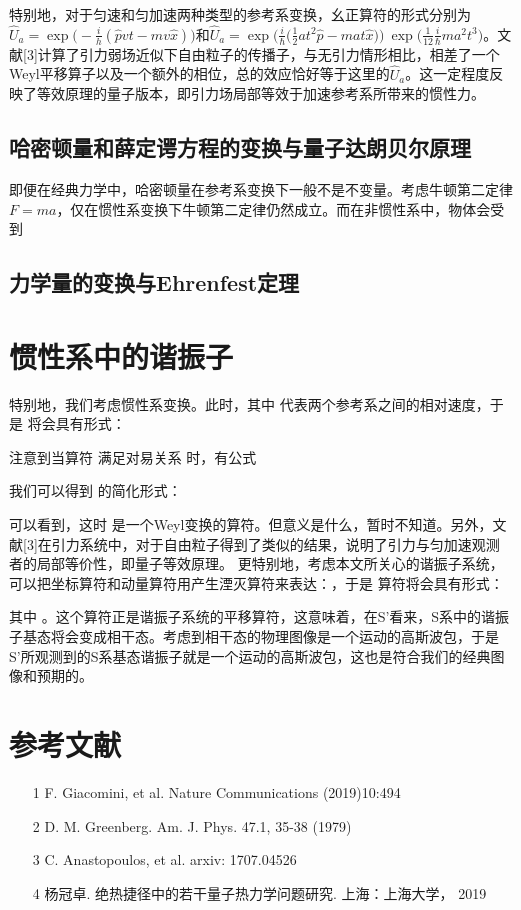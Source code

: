 \documentclass[a4paper]{article}
\begin{document}
        特别地，对于匀速和匀加速两种类型的参考系变换，幺正算符的形式分别为$\hat{U}_a=\exp\big(-\frac{i}{h}(\hat{p}vt-mv\hat{x})\big)$和$\hat{U}_a=\exp\big(\frac{i}{\hbar}\big(\frac{1}{2}at^2\hat{p}-mat\hat{x} \big)\big)\ \exp\big(\frac{1}{12}\frac{i}{\hbar}ma^2t^3\big)$。文献[3]计算了引力弱场近似下自由粒子的传播子，与无引力情形相比，相差了一个Weyl平移算子以及一个额外的相位，总的效应恰好等于这里的$\hat{U}_a$。这一定程度反映了等效原理的量子版本，即引力场局部等效于加速参考系所带来的惯性力。

        \subsection{哈密顿量和薛定谔方程的变换与量子达朗贝尔原理}

            即便在经典力学中，哈密顿量在参考系变换下一般不是不变量。考虑牛顿第二定律$F=ma$，仅在惯性系变换下牛顿第二定律仍然成立。而在非惯性系中，物体会受到


        \subsection{力学量的变换与Ehrenfest定理}



    \section{惯性系中的谐振子}
        特别地，我们考虑惯性系变换。此时，其中 代表两个参考系之间的相对速度，于是 将会具有形式：
        
        注意到当算符 满足对易关系 时，有公式
        
        我们可以得到 的简化形式：
        
        可以看到，这时 是一个Weyl变换的算符。但意义是什么，暂时不知道。另外，文献[3]在引力系统中，对于自由粒子得到了类似的结果，说明了引力与匀加速观测者的局部等价性，即量子等效原理。
        更特别地，考虑本文所关心的谐振子系统，可以把坐标算符和动量算符用产生湮灭算符来表达：，于是 算符将会具有形式：
        
        其中 。这个算符正是谐振子系统的平移算符，这意味着，在S’看来，S系中的谐振子基态将会变成相干态。考虑到相干态的物理图像是一个运动的高斯波包，于是S’所观测到的S系基态谐振子就是一个运动的高斯波包，这也是符合我们的经典图像和预期的。
    


    \section*{参考文献}
    \begin{itemize}
        \item[1] F. Giacomini, et al. Nature Communications (2019)10:494
        \item[2] D. M. Greenberg. Am. J. Phys. 47.1, 35-38 (1979)
        \item[3] C. Anastopoulos, et al. arxiv: 1707.04526
        \item[4] 杨冠卓. 绝热捷径中的若干量子热力学问题研究. 上海：上海大学， 2019
    \end{itemize}
\end{document}
